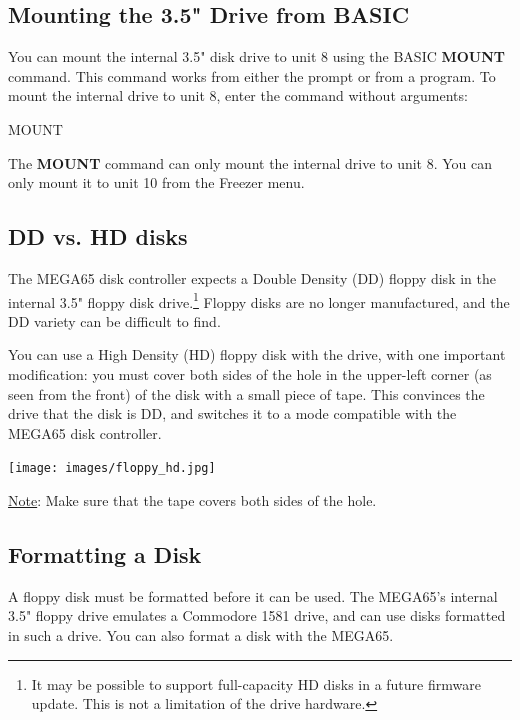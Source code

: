 \subsection{Mounting the 3.5" Drive from BASIC}

You can mount the internal 3.5" disk drive to unit 8 using the BASIC {\bf MOUNT} command. This command works from either the  prompt or from a program. To mount the internal drive to unit 8, enter the command without arguments:

\begin{screenoutput}
MOUNT
\end{screenoutput}

The {\bf MOUNT} command can only mount the internal drive to unit 8. You can only mount it to unit 10 from the Freezer menu.

\subsection{DD vs. HD disks}

The MEGA65 disk controller expects a Double Density (DD) floppy disk in the internal 3.5" floppy disk drive.\footnote{It may be possible to support full-capacity HD disks in a future firmware update. This is not a limitation of the drive hardware.} Floppy disks are no longer manufactured, and the DD variety can be difficult to find.

You can use a High Density (HD) floppy disk with the drive, with one important modification: you must cover both sides of the hole in the upper-left corner (as seen from the front) of the disk with a small piece of tape. This convinces the drive that the disk is DD, and switches it to a mode compatible with the MEGA65 disk controller.

\begin{center}
  \texttt{[image: images/floppy\_hd.jpg]}
\end{center}

\underline{Note}: Make sure that the tape covers both sides of the hole.

\subsection{Formatting a Disk}

A floppy disk must be formatted before it can be used. The MEGA65's internal 3.5" floppy drive emulates a Commodore 1581 drive, and can use disks formatted in such a drive. You can also format a disk with the MEGA65.

